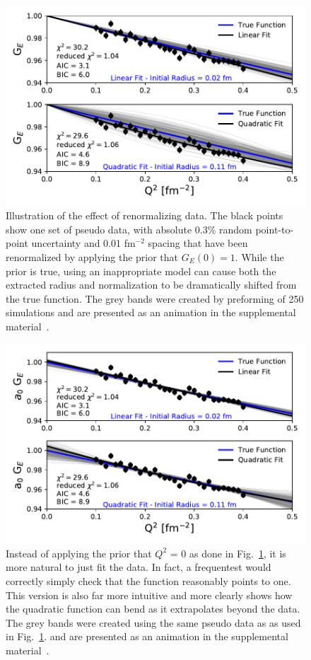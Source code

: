 \documentclass[10pt,aps,prc,twocolumn]{revtex4-1}
\begin{document}
\begin{figure}[htb]
\includegraphics[width=\columnwidth]{Figure/linearVSquadratic-band.pdf}
\caption{Illustration of the effect of renormalizing data.  The
black points show one set of pseudo data, with absolute 0.3\% random point-to-point 
uncertainty and 0.01 fm$^{-2}$ spacing that have been renormalized
by applying the prior that $G_E(0)=1$.    While the prior is true, using an inappropriate model
can cause both the extracted radius and normalization to be dramatically shifted from the true
function.   
The grey bands were created by preforming of 250 simulations and are presented as
an animation in the supplemental material~\cite{Supplement}.}
\label{linearVSquadratic}
\end{figure}

\begin{figure}[htb]
\includegraphics[width=\columnwidth]{Figure/frequentist-band.pdf}
\caption{Instead of applying the prior that $Q^2$ = 0 as done in Fig.~\ref{linearVSquadratic}, it is more natural to
just fit the data.  In fact, a frequentest would correctly simply check that the function reasonably points to one.
This version is also far more intuitive and more clearly shows how the quadratic function can bend as it extrapolates 
beyond the data.   
The grey bands were created using the same pseudo data as
as used in Fig.~\ref{linearVSquadratic}. 
and are presented as
an animation in the supplemental material~\cite{Supplement}. }
\end{figure}
\end{document}
